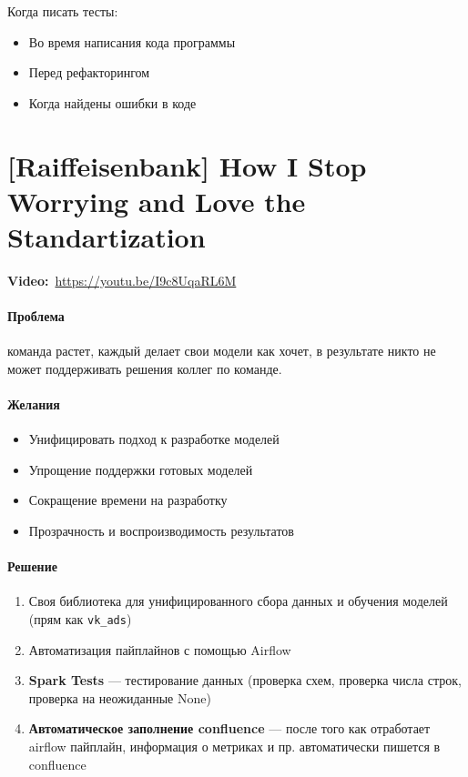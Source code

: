 Когда писать тесты:
\begin{itemize}
    \item Во время написания кода программы
    \item Перед рефакторингом
    \item Когда найдены ошибки в коде
\end{itemize}

\section{[Raiffeisenbank] How I Stop Worrying and Love the Standartization}

\textbf{Video:}~\url{https://youtu.be/I9c8UqaRL6M} \\

\paragraph{Проблема} команда растет, каждый делает свои модели как хочет, в результате никто не может поддерживать решения коллег по команде.

\paragraph{Желания}

\begin{itemize}
    \item Унифицировать подход к разработке моделей
    \item Упрощение поддержки готовых моделей
    \item Сокращение времени на разработку
    \item Прозрачность и воспроизводимость результатов
\end{itemize}

\paragraph{Решение} 

\begin{enumerate}
    \item Своя библиотека для унифицированного сбора данных и обучения моделей (прям как \texttt{vk\_ads})
    \item Автоматизация пайплайнов с помощью Airflow
    \item \textbf{Spark Tests} --- тестирование данных (проверка схем, проверка числа строк, проверка на неожиданные None)
    \item \textbf{Автоматическое заполнение confluence} --- после того как отработает airflow пайплайн, информация о метриках и пр. автоматически пишется в confluence
\end{enumerate}

